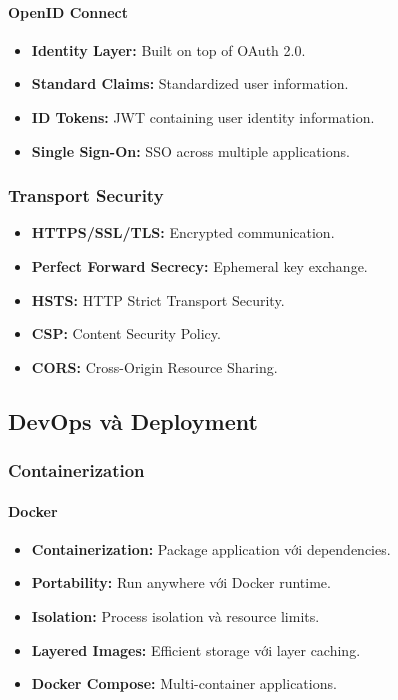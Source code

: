 \documentclass[a4paper,12pt]{report}
\begin{document}
\paragraph{OpenID Connect}
\begin{itemize}
    \item \textbf{Identity Layer:} Built on top of OAuth 2.0.
    \item \textbf{Standard Claims:} Standardized user information.
    \item \textbf{ID Tokens:} JWT containing user identity information.
    \item \textbf{Single Sign-On:} SSO across multiple applications.
\end{itemize}

\subsubsection{Transport Security}
\begin{itemize}
    \item \textbf{HTTPS/SSL/TLS:} Encrypted communication.
    \item \textbf{Perfect Forward Secrecy:} Ephemeral key exchange.
    \item \textbf{HSTS:} HTTP Strict Transport Security.
    \item \textbf{CSP:} Content Security Policy.
    \item \textbf{CORS:} Cross-Origin Resource Sharing.
\end{itemize}

\subsection{DevOps và Deployment}

\subsubsection{Containerization}

\paragraph{Docker}
\begin{itemize}
    \item \textbf{Containerization:} Package application với dependencies.
    \item \textbf{Portability:} Run anywhere với Docker runtime.
    \item \textbf{Isolation:} Process isolation và resource limits.
    \item \textbf{Layered Images:} Efficient storage với layer caching.
    \item \textbf{Docker Compose:} Multi-container applications.
\end{itemize}
\end{document}
